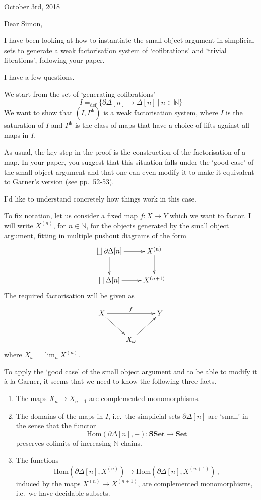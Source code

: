 \documentclass[11pt, oneside]{article}   	%
\newcommand{\Nat}{\mathbb{N}}
\newcommand{\defeq}{=_\text{def}}
\newcommand{\co}{\colon}
\newcommand{\SSet}{\mathbf{SSet}}
\newcommand{\Set}{\mathbf{Set}}
\newcommand{\boundary}{\partial}
\begin{document}
\begin{flushright}
October 3rd, 2018
\end{flushright}

Dear Simon,

\bigskip

I have been looking at how to instantiate the small object argument in simplicial sets to generate a weak
factorisation system of `cofibrations' and `trivial fibrations', following your paper.

I have a few questions.

We start from the set of `generating cofibrations'
\[
I \defeq \{ \partial \Delta[n] \to \Delta[n] \ | \ n \in \Nat \}
\]
We want to show that $(\overline{I}, I^\pitchfork)$ is a weak factorisation system, where $\overline{I}$ is
the saturation of $I$ and $I^\pitchfork$ is the class of maps that have a choice of lifts against all maps
in $I$. 

As usual, the key step in the proof is the construction of the factorisation of a map. In your paper, you suggest that this situation falls under the `good case' of the small object argument 
and that one can even modify it to make it equivalent to Garner's version (see pp.~52-53). 

I'd like to understand concretely how things work in this case.

To fix notation, let us consider a fixed map $f \co X \to Y$ which we want to factor. I will write $X^{(n)}$, for $n \in \Nat$, for the objects generated by the small object argument, fitting in multiple pushout diagrams of the form
\[
\xymatrix{
\bigsqcup \partial \Delta[n] \ar[r] \ar[d]  & X^{(n)} \ar[d] \\
\bigsqcup \Delta[n] \ar[r]. & X^{(n+1)} }
\]
The required factorisation will be given as 
\[
 \xymatrix{
  X \ar[rr]^f \ar[dr] & & Y \\
   & X_\omega \ar[ur] & }
   \]
where $X_\omega = \lim_{n} X^{(n)}$. 

To apply the `good case' of the small object argument and to be able to modify it \`a la Garner, it seems that we need to know the following three facts. 
\begin{enumerate}
\item The maps $X_n \to X_{n+1}$ are complemented monomorphisms. 
\item The domains of the maps in $I$, i.e.~the simplicial sets $\boundary \Delta[n]$ are `small' in the
sense that  the functor
\[
\mathrm{Hom}( \boundary \Delta[n], -) \co \SSet \to \Set
\] 
preserves colimits of increasing $\Nat$-chains.
\item The functions
\begin{equation}
\tag{$\ast$}
\mathrm{Hom}( \boundary \Delta[n], X^{(n)}) \to \mathrm{Hom}(\boundary \Delta[n], X^{(n+1)}) \, , 
\end{equation}
induced by the maps $X^{(n)} \to X^{(n+1)}$, are complemented monomorphisms, i.e.~we have  decidable subsets.
\end{enumerate}
\end{document}
